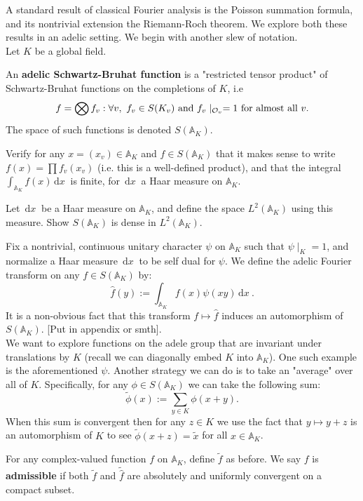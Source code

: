 \documentclass[11pt, x11names, openany]{book}
\renewcommand{\aa}{\mathbb{A}}
\newcommand{\bigtensor}{\bigotimes}
\renewcommand{\hat}{\widehat}
\newcommand{\dx}{\, \mathrm{d}x \ }
\begin{document}
A standard result of classical Fourier analysis is the Poisson summation formula, and its nontrivial extension the Riemann-Roch theorem. We explore both these results in an adelic setting. We begin with another slew of notation.\\
Let $K$ be a global field.
\begin{defn}
\label{def: adelic SB-functions}
An \textbf{adelic Schwartz-Bruhat function} is a "restricted tensor product" of Schwartz-Bruhat functions on the completions of $K$, i.e
\begin{equation*}
    f = \bigtensor f_v : \forall v, \ f_v \in S(K_v) \text{ and } f_v\mid_{\calo_v} = 1 \text{ for almost all } v.
\end{equation*}
The space of such functions is denoted $S(\aa_K)$.
\end{defn}
\begin{sanitycheck}
    Verify for any $x = (x_v) \in \aa_K$ and $f \in S(\aa_K)$ that it makes sense to write $f(x) = \prod f_v(x_v)$ (i.e. this is a well-defined product), and that the integral $\int_{\aa_K} f(x) \dx$ is finite, for $\dx$ a Haar measure on $\aa_K$.
\end{sanitycheck}
\begin{exercise}
\label{exercise: S(A_K) dense in L^2(A_K)}
    Let $\dx$ be a Haar measure on $\aa_K$, and define the space $L^2(\aa_K)$ using this measure. Show $S(\aa_K)$ is dense in $L^2(\aa_K)$.
\end{exercise}
Fix a nontrivial, continuous unitary character $\psi$ on $\aa_K$ such that $\psi \mid_K = 1$, and normalize a Haar measure $\dx$ to be self dual for $\psi$. We define the adelic Fourier transform on any $f \in S(\aa_K)$ by:
\begin{equation*}
    \hat{f}(y) := \int_{\aa_K} f(x) \psi(xy) \dx.
\end{equation*}
It is a non-obvious fact that this transform $f \mapsto \hat{f}$ induces an automorphism of $S(\aa_K)$. [Put in appendix or smth].\\

We want to explore functions on the adele group that are invariant under translations by $K$ (recall we can diagonally embed $K$ into $\aa_K$). One such example is the aforementioned $\psi$. Another strategy we can do is to take an "average" over all of $K$. Specifically, for any $\phi \in S(\aa_K)$ we can take the following sum:
\begin{equation*}
    \widetilde{\phi}(x) := \sum_{y \in K} \phi(x + y).
\end{equation*}
When this sum is convergent then for any $z \in K$ we use the fact that $y \mapsto y + z$ is an automorphism of $K$ to see $\widetilde{\phi}(x + z) = \widetilde{x}$ for all $x \in \aa_K$.
\begin{defn}
\label{def: admissible function}
    For any complex-valued function $f$ on $\aa_K$, define $\widetilde{f}$ as before. We say $f$ is \textbf{admissible} if both $\widetilde{f}$ and $\widetilde{\hat{f}}$ are absolutely and uniformly convergent on a compact subset. 
\end{defn}
\end{document}
